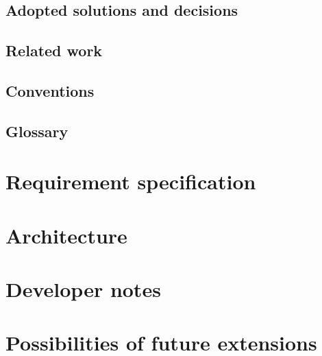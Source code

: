 \documentclass[12pt,a4paper]{report}
\begin{document}
\section{Adopted solutions and decisions}
\section{Related work}
\section{Conventions}
\section{Glossary}

\chapter{Requirement specification}

\chapter{Architecture}

\chapter{Developer notes}

\chapter{Possibilities of future extensions}
\end{document}
